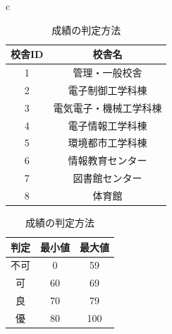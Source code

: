 \documentclass[a4j]{jarticle}
\begin{document}
        \begin{table}[H]
          \begin{center}
            \begin{tabular}{c}
             
              \begin{minipage}{0.5\hsize}
          \caption{校舎の一覧}
          \label{kosha}
          \begin{center}
            \begin{tabular}{c|c}\hline
              校舎ID & 校舎名 \\ \hline \hline
              1 & 管理・一般校舎 \\ \hline 
              2 & 電子制御工学科棟 \\ \hline 
              3 & 電気電子・機械工学科棟 \\ \hline 
              4 & 電子情報工学科棟 \\ \hline 
              5 & 環境都市工学科棟 \\ \hline 
              6 & 情報教育センター \\ \hline 
              7 & 図書館センター \\ \hline 
              8 & 体育館 \\ \hline 
             \end{tabular}
          \end{center}
        \end{minipage}

        \begin{minipage}{0.5\hsize}
            \caption{成績の判定方法}
            \label{hantei}
            \begin{center}
              \begin{tabular}{c|c|c}\hline
                判定 & 最小値 & 最大値 \\ \hline \hline
                不可 & 0 & 59 \\ \hline
                可 & 60 & 69 \\ \hline
                良 & 70 & 79\\ \hline
                優 & 80 & 100\\ \hline
               \end{tabular}
            \end{center}
          \end{minipage}
        \end{tabular}
      \end{center}
            \end{table}
\end{document}
